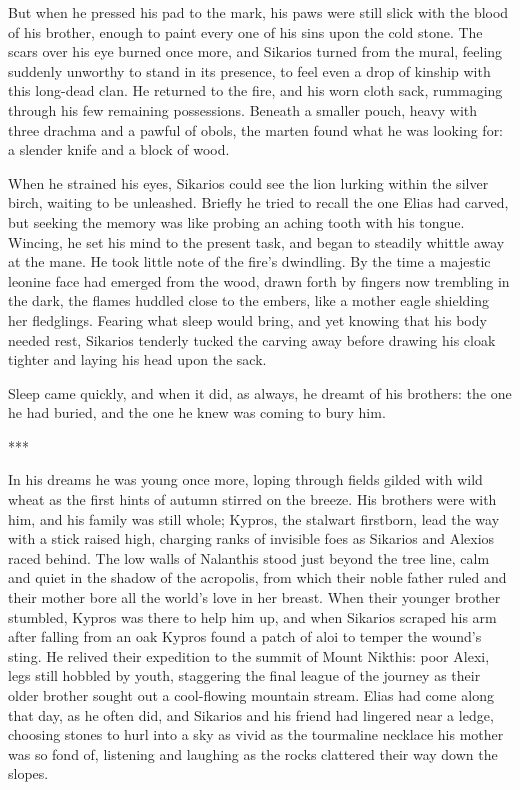 But when he pressed his pad to the mark, his paws were still slick with the blood of his brother, enough to paint every one of his sins upon the cold stone. The scars over his eye burned once more, and Sikarios turned from the mural, feeling suddenly unworthy to stand in its presence, to feel even a drop of kinship with this long-dead clan. He returned to the fire, and his worn cloth sack, rummaging through his few remaining possessions. Beneath a smaller pouch, heavy with three drachma and a pawful of obols, the marten found what he was looking for: a slender knife and a block of wood.

When he strained his eyes, Sikarios could see the lion lurking within the silver birch, waiting to be unleashed. Briefly he tried to recall the one Elias had carved, but seeking the memory was like probing an aching tooth with his tongue. Wincing, he set his mind to the present task, and began to steadily whittle away at the mane. He took little note of the fire's dwindling. By the time a majestic leonine face had emerged from the wood, drawn forth by fingers now trembling in the dark, the flames huddled close to the embers, like a mother eagle shielding her fledglings. Fearing what sleep would bring, and yet knowing that his body needed rest, Sikarios tenderly tucked the carving away before drawing his cloak tighter and laying his head upon the sack.

Sleep came quickly, and when it did, as always, he dreamt of his brothers: the one he had buried, and the one he knew was coming to bury him.

***

In his dreams he was young once more, loping through fields gilded with wild wheat as the first hints of autumn stirred on the breeze. His brothers were with him, and his family was still whole; Kypros, the stalwart firstborn, lead the way with a stick raised high, charging ranks of invisible foes as Sikarios and Alexios raced behind. The low walls of Nalanthis stood just beyond the tree line, calm and quiet in the shadow of the acropolis, from which their noble father ruled and their mother bore all the world's love in her breast. When their younger brother stumbled, Kypros was there to help him up, and when Sikarios scraped his arm after falling from an oak Kypros found a patch of aloi to temper the wound's sting. He relived their expedition to the summit of Mount Nikthis: poor Alexi, legs still hobbled by youth, staggering the final league of the journey as their older brother sought out a cool-flowing mountain stream. Elias had come along that day, as he often did, and Sikarios and his friend had lingered near a ledge, choosing stones to hurl into a sky as vivid as the tourmaline necklace his mother was so fond of, listening and laughing as the rocks clattered their way down the slopes.

